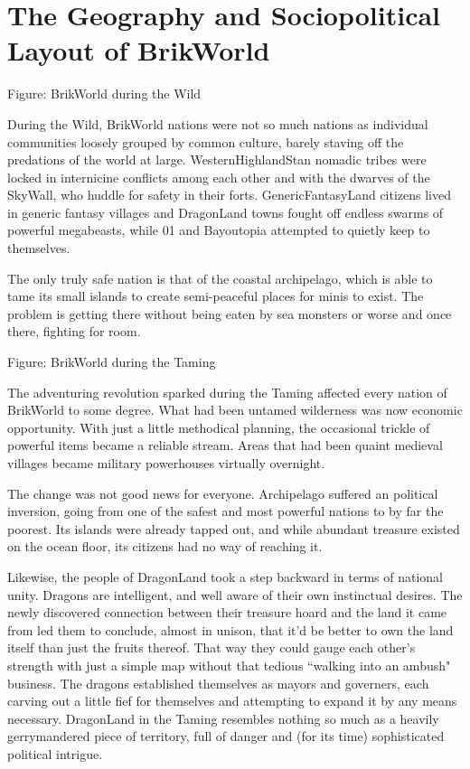 \documentclass[12pt,a4paper,twocolumn]{article}
\begin{document}
\section{The Geography and Sociopolitical Layout of BrikWorld}

Figure: BrikWorld during the Wild

During the Wild, BrikWorld nations were not so much nations as individual communities loosely grouped by common culture, barely staving off the predations of the world at large.  WesternHighlandStan nomadic tribes were locked in internicine conflicts among each other and with the dwarves of the SkyWall, who huddle for safety in their forts.  GenericFantasyLand citizens lived in generic fantasy villages and DragonLand towns fought off endless swarms of powerful megabeasts, while 01 and Bayoutopia attempted to quietly keep to themselves.

The only truly safe nation is that of the coastal archipelago, which is able to tame its small islands to create semi-peaceful places for minis to exist.  The problem is getting there without being eaten by sea monsters or worse and once there, fighting for room.

Figure: BrikWorld during the Taming

The adventuring revolution sparked during the Taming affected every nation of BrikWorld to some degree.  What had been untamed wilderness was now economic opportunity.  With just a little methodical planning, the occasional trickle of powerful items became a reliable stream.  Areas that had been quaint medieval villages became military powerhouses virtually overnight.

The change was not good news for everyone.  Archipelago suffered an political inversion, going from one of the safest and most powerful nations to by far the poorest.  Its islands were already tapped out, and while abundant treasure existed on the ocean floor, its citizens had no way of reaching it.

Likewise, the people of DragonLand took a step backward in terms of national unity.  Dragons are intelligent, and well aware of their own instinctual desires.  The newly discovered connection between their treasure hoard and the land it came from led them to conclude, almost in unison, that it'd be better to own the land itself than just the fruits thereof.  That way they could gauge each other's strength with just a simple map without that tedious ``walking into an ambush" business.  The dragons established themselves as mayors and governers, each carving out a little fief for themselves and attempting to expand it by any means necessary.  DragonLand in the Taming resembles nothing so much as a heavily gerrymandered piece of territory, full of danger and (for its time) sophisticated political intrigue.
\end{document}
